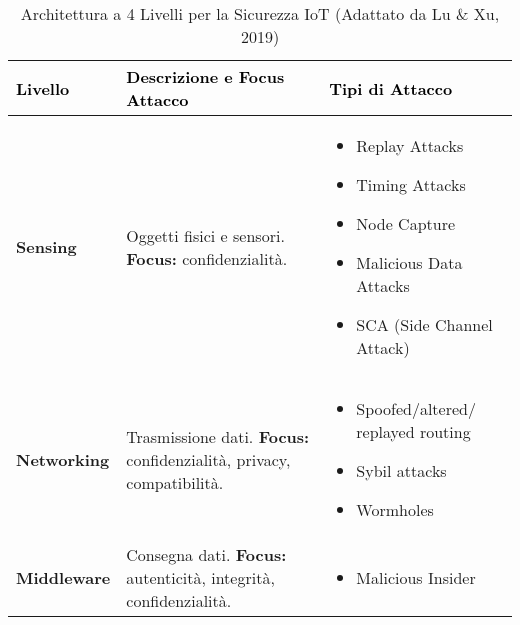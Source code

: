 \begin{table}[H]
\centering
\caption{Architettura a 4 Livelli per la Sicurezza IoT (Adattato da Lu \& Xu, 2019)}
\label{tab:iot_architecture}
\begin{tabular}{|p{}|p{}|p{}|}
\hline
\rowcolor{gray!15} %
\textcolor{black}{\textbf{Livello}} & \textcolor{black}{\textbf{Descrizione e Focus Attacco}} & \textcolor{black}{\textbf{Tipi di Attacco}} \\
\hline
\textbf{Sensing} & Oggetti fisici e sensori. \newline \textbf{Focus:} confidenzialità. &
    \begin{itemize}[nosep, leftmargin=*, itemsep=-2pt, before=\vspace{-0.5\baselineskip}, after=\vspace{-\baselineskip}]
        \item Replay Attacks
        \item Timing Attacks
        \item Node Capture
        \item Malicious Data Attacks
        \item SCA (Side Channel Attack)
    \end{itemize} \\
\hline
\textbf{Networking} & Trasmissione dati. \newline \textbf{Focus:} confidenzialità, privacy, compatibilità. &
    \begin{itemize}[nosep, leftmargin=*, itemsep=-2pt, before=\vspace{-0.5\baselineskip}, after=\vspace{-\baselineskip}]
        \item Spoofed/altered/ replayed routing
        \item Sybil attacks
        \item Wormholes
    \end{itemize} \\
\hline
\textbf{Middleware} & Consegna dati. \newline \textbf{Focus:} autenticità, integrità, confidenzialità. &
    \begin{itemize}[nosep, leftmargin=*, itemsep=-2pt, before=\vspace{-0.5\baselineskip}, after=\vspace{-\baselineskip}]
        \item Malicious Insider

\end{itemize}
\end{tabular}
\end{table}
